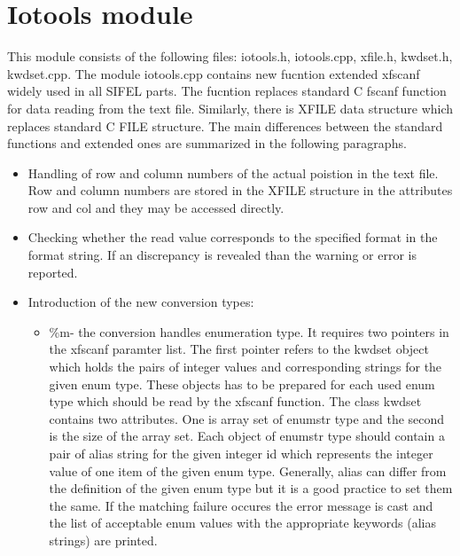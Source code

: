 \section {Iotools module}
This module consists of the following files:
{\sf iotools.h, iotools.cpp, xfile.h, kwdset.h, kwdset.cpp}.
The module {\sf iotools.cpp} contains new fucntion extended {\sf xfscanf} widely used in all SIFEL
parts. The fucntion replaces standard C {\sf fscanf} function for data reading from the text
file. Similarly, there is {\sf XFILE} data structure which replaces standard C {\sf FILE} structure.
The main differences between the standard functions and extended ones are summarized in the following paragraphs. 
\begin{itemize}
\item Handling of row and column numbers of the actual poistion in the text file. Row and column 
      numbers are stored in the {\sf XFILE} structure in the attributes {\sf row} and {\sf col} and they may
      be accessed directly.
\item Checking whether the read value corresponds to the specified format in the format string. If an discrepancy
      is revealed than the warning or error is reported.
\item Introduction of the new conversion types:
      \begin {itemize}
      \item {\sf \textquotedbl \%m\textquotedbl}- the conversion handles enumeration type. It requires two pointers
       in the xfscanf paramter list. The first pointer refers to the {\sf kwdset} object which
      holds the pairs of integer values and corresponding strings for the given {\sf enum} type.
      These objects has to be prepared for each used enum type which should be read by the xfscanf function.
      The class {\sf kwdset} contains two attributes. One is array {\sf set} of {\sf enumstr} type and 
      the second is the size of the array {\sf set}. Each object of {\sf enumstr} type should contain a
      pair of {\sf alias} string for the given integer {\sf id} which represents the integer value of 
      one item of the given {\sf enum} type. Generally, {\sf alias} can differ from the definition of 
      the given enum type but it is a good practice to set them the same.
      If the matching failure occures the error message is cast and the list of acceptable enum values
      with the appropriate keywords ({\sf alias} strings) are printed. 
      

\end{itemize}
\end{itemize}
